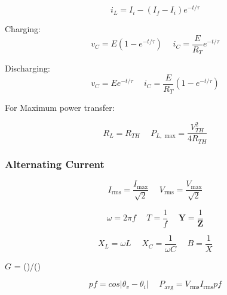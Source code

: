 \documentclass[twocolumn, 12pt]{article}
\begin{document}
{        \begin{equation*}
            i_L=I_i-(I_f-I_i)e^{-t/\tau}
        \end{equation*}
        
Charging:
        \begin{equation*}
            v_C=E(1-e^{-t/\tau}) \hspace{15pt}i_C=\frac{E}{R_T}e^{-t/\tau}
        \end{equation*}
        
Discharging:
        \begin{equation*}
            v_C=Ee^{-t/\tau}  \hspace{15pt}i_C=\frac{E}{R_T}(1-e^{-t/\tau})
        \end{equation*}
        
        
For Maximum power transfer:
        
        \begin{equation*}
            R_L=R_{TH} \hspace{15pt} P_{L,\text{ max}} =\frac{V_{TH}^2}{4R_{TH}}
        \end{equation*}
        
\subsubsection*{Alternating Current}
        \begin{equation*}
            I_{\text{rms}} = \frac{I_{\text{max}}}{\sqrt{2}} \hspace{15pt}  V_{\text{rms}} =\frac{V_{\text{max}}}{\sqrt{2}} 
        \end{equation*}
        
        \begin{equation*}
            \omega=2\pi f  \hspace{15pt} T=\frac{1}{f} \hspace{15pt} \textbf{Y}=\frac{1}{\textbf{Z}}  
        \end{equation*}
        
        
        \begin{equation*}
            X_L= \omega L \hspace{15pt} X_C=\frac{1}{\omega C} \hspace{15pt}B=\frac{1}{X}
        \end{equation*}
    
        \(G\) = ()/()
        
        \begin{equation*}
            pf=cos|\theta_v-\theta_i| \hspace{15pt} P_{\text{avg}}=V_{\text{rms}}I_{\text{rms}}pf
        \end{equation*}
        
}
\end{document}
